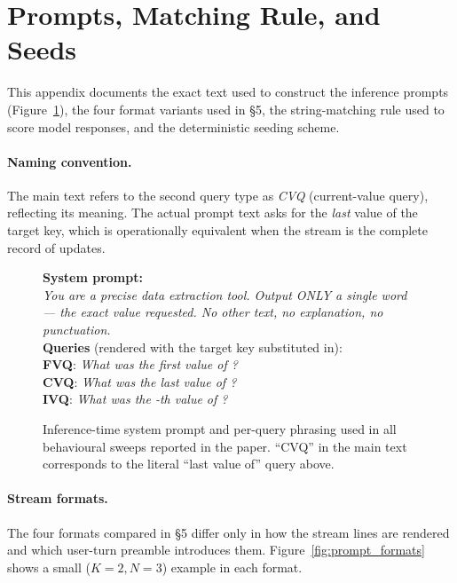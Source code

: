 \documentclass[letterpaper]{article} %
\begin{document}
\section{Prompts, Matching Rule, and Seeds}
\label{app:prompts}

This appendix documents the exact text used to construct the
inference prompts (Figure~\ref{fig:prompt_system}), the four format variants used in
\S5, the string-matching rule used to score model
responses, and the deterministic seeding scheme.

\paragraph{Naming convention.}
The main text refers to the second query type as \emph{CVQ}
(current-value query), reflecting its meaning. The actual prompt
text asks for the \emph{last} value of the target key, which is
operationally equivalent when the stream is the complete record of
updates.

\begin{figure}[h]
\small
\centering
\begin{tcolorbox}[
    colframe=black!30, colback=gray!4,
    boxrule=0.5pt, arc=2pt,
    left=6pt, right=6pt, top=4pt, bottom=4pt,
    title={\textbf{System prompt and queries}},
    fonttitle=\small\bfseries,
    coltitle=black]
\textbf{System prompt:}\\[1pt]
\emph{You are a precise data extraction tool. Output ONLY a single
word --- the exact value requested. No other text, no explanation,
no punctuation.}\\[6pt]
\textbf{Queries} (rendered with the target key substituted in):\\[1pt]
\textbf{FVQ}: \emph{What was the first value of {\sc[target]}?}\\
\textbf{CVQ}: \emph{What was the last value of {\sc[target]}?}\\
\textbf{IVQ}: \emph{What was the {\sc[k]}-th value of
{\sc[target]}?}
\end{tcolorbox}
\caption{Inference-time system prompt and per-query phrasing used in
all behavioural sweeps reported in the paper. ``CVQ'' in the main
text corresponds to the literal ``last value of'' query above.}
\label{fig:prompt_system}
\end{figure}

\paragraph{Stream formats.}
The four formats compared in \S5 differ only in
how the stream lines are rendered and which user-turn preamble
introduces them. Figure~\ref{fig:prompt_formats} shows a small
($K{=}2, N{=}3$) example in each format.
\end{document}
